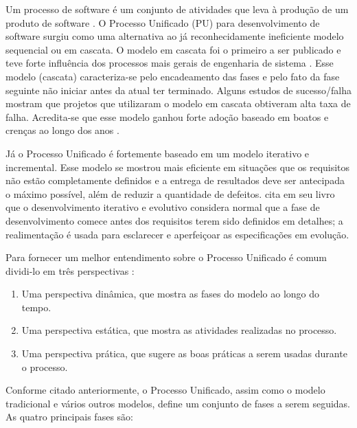 \documentclass[
	article,			%
	11pt,				%
	oneside,			%
	a4paper,			%
	english,			%
	brazil,				%
	sumario=tradicional
	]{abntex2}
\begin{document}
\label{processo-unificado}

Um processo de software é um conjunto de atividades que leva à produção de um
produto de software \cite{sommerville2007}. O Processo Unificado (PU)
\cite{jacobson1999unified} para desenvolvimento de software surgiu como uma
alternativa ao já reconhecidamente ineficiente modelo sequencial ou em cascata.
O modelo em cascata foi o primeiro a ser publicado e teve forte influência dos
processos mais gerais de engenharia de sistema \cite{sommerville2007}. Esse
modelo (cascata) caracteriza-se pelo encadeamento das fases e pelo fato da fase
seguinte não iniciar antes da atual ter terminado. Alguns estudos de
sucesso/falha mostram que projetos que utilizaram o modelo em cascata obtiveram
alta taxa de falha. Acredita-se que esse modelo ganhou forte adoção baseado em
boatos e crenças ao longo dos anos \cite{larman2007utilizando}.

Já o Processo Unificado é fortemente baseado em um modelo
iterativo e incremental. Esse modelo se mostrou mais eficiente em situações que os
requisitos não estão completamente definidos e a entrega de resultados deve ser
antecipada o máximo possível, além de reduzir a quantidade de defeitos.
 cita em seu livro que o desenvolvimento
iterativo e evolutivo considera normal que a fase de desenvolvimento comece
antes dos requisitos terem sido definidos em detalhes; a realimentação é usada
para esclarecer e aperfeiçoar as especificações em evolução.

Para fornecer um melhor entendimento sobre o Processo Unificado é comum
dividi-lo em três perspectivas \cite{sommerville2007}:

\begin{enumerate}
   \item Uma perspectiva dinâmica, que mostra as fases do modelo ao longo do
   tempo.
   \item Uma perspectiva  estática, que mostra as atividades realizadas no
   processo.
   \item Uma perspectiva prática, que sugere as boas práticas a serem usadas
   durante o processo.
\end{enumerate}

Conforme citado anteriormente, o Processo Unificado, assim como o modelo
tradicional e vários outros modelos, define um conjunto de fases a serem
seguidas. As quatro principais fases são:
\end{document}

